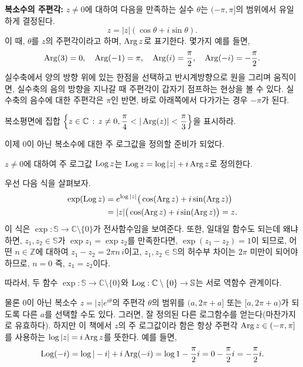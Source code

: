 {\bf 복소수의 주편각: }
$z\ne0$에 대하여 다음을 만족하는 실수 $\theta$는 $(-\pi, \pi]$의 범위에서 유일하게 결정된다.
$$
z = |z|(\cos \theta + i\sin\theta).
$$
이 때, $\theta$를 $z$의 주편각이라고 하며, $\mathop{\mathrm{Arg}} z$로 표기한다.
몇가지 예를 들면,
$$
\mathop{\mathrm{Arg}}(3) = 0, \quad \mathop{\mathrm{Arg}}(-1)=\pi, \quad
\mathop{\mathrm{Arg}}(i) = \frac\pi2, \quad \mathop{\mathrm{Arg}}(-i) = - \frac\pi2.
$$
실수축에서 양의 방향 위에 있는 한점을 선택하고
반시계방향으로 원을 그리며 움직이면, 실수축의 음의 방향을 지나갈 때
주편각이 갑자기 점프하는 현상을 볼 수 있다.
실수축의 음수에 대한 주편각은 $\pi$인 반면,
바로 아래쪽에서 다가가는 경우 $-\pi$가 된다.

\begin{salt_exercise}\label{ex-1-39}
복소평면에 집합 $\left\{ z \in\mathbb C \,:\, z\ne0, \displaystyle\frac\pi4 < |\mathop{\mathrm{Arg}}(z)| < \displaystyle\frac\pi3 \right\}$을
표시하라.
\end{salt_exercise}

이제 $0$이 아닌 복소수에 대한 주 로그값을 정의할 준비가 되었다.

\begin{saltdefinition} {}{} \label{def-1-3}
$z\ne0$에 대하여 주 로그값 $\mathop{\mathrm{Log}} z$는 
$\mathop{\mathrm{Log}} z = \log |z| + i\mathop{\mathrm{Arg}} z$로 정의한다.
\end{saltdefinition}

우선 다음 식을 살펴보자.
\begin{align*}
\exp(\mathop{\mathrm{Log}} z) &= e^{\log |z|} \big( \cos(\mathop{\mathrm{Arg}} z) + i \sin(\mathop{\mathrm{Arg}} z) \big) \\
&= |z| \big( \cos(\mathop{\mathrm{Arg}} z) + i \sin(\mathop{\mathrm{Arg}} z) \big) = z.
\end{align*}
이 식은  $\exp: \mathbb S \to \mathbb C \setminus \{0\}$가 전사함수임을 보여준다.
또한, 일대일 함수도 되는데 왜냐 하면, $z_1, z_2 \in \mathbb S$가 $\exp z_1 = \exp z_2$를 만족한다면,
$\exp(z_1 - z_2) = 1$이 되므로, 
어떤 $n\in\mathbb Z$에 대하여 $z_1 - z_2 = 2\pi n\,i$이고,
$z_1, z_2 \in \mathbb S$의 허수부 차이는 $2\pi$ 미만이 되어야 하므로, $n=0$ 즉, 
$z_1 = z_2$이다.

따라서, 두 함수 $\exp : \mathbb S \to \mathbb C \setminus \{0\}$와
$\mathop{\mathrm{Log}} : \mathbb C \setminus \{0\} \to \mathbb S$는 서로 역함수 관계이다.

물론 $0$이 아닌 복소수 $z=|z|e^{i\theta}$의 주편각 $\theta$의 범위를 
$(a, 2\pi +a]$ 또는 $[a, 2\pi+a)$가 되도록 다른 $a$를 선택할 수도 있다.
그러면, 잘 정의된 다른 로그함수를 얻는다(마찬가지로 유효하다).
하지만 이 책에서 $z$의 주 로그값이라 함은 항상 주편각 $\mathop{\mathrm{Arg}} z \in (-\pi, \pi]$를 사용하는
$\log |z| = i\mathop{\mathrm{Arg}} z$를 뜻한다.
예를 들면,
$$
\mathop{\mathrm{Log}} (-i) = \log|-i| + i\mathop{\mathrm{Arg}}(-i) = \log 1 - \displaystyle\frac\pi2 i = 0 - \displaystyle\frac\pi 2 i = -\displaystyle\frac\pi 2 i.
$$

